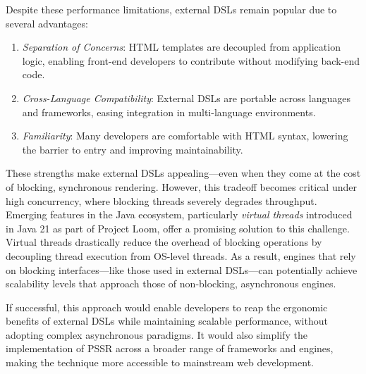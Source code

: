 Despite these performance limitations, external DSLs remain popular due to
several advantages:

\begin{enumerate}
    \item \emph{Separation of Concerns}: HTML templates are decoupled from application logic, enabling front-end developers to contribute without modifying back-end code.
    \item \emph{Cross-Language Compatibility}: External DSLs are portable across languages and frameworks, easing integration in multi-language environments.
    \item \emph{Familiarity}: Many developers are comfortable with HTML syntax, lowering the barrier to entry and improving maintainability.
\end{enumerate}

These strengths make external DSLs appealing—even when they come at the cost of
blocking, synchronous rendering. However, this tradeoff becomes critical under
high concurrency, where blocking threads severely degrades throughput. Emerging
features in the Java ecosystem, particularly \textit{virtual threads}
introduced in Java 21 as part of Project Loom, offer a promising solution to
this challenge. Virtual threads drastically reduce the overhead of blocking
operations by decoupling thread execution from OS-level threads. As a result,
engines that rely on blocking interfaces—like those used in
external DSLs—can potentially achieve scalability levels that approach those of
non-blocking, asynchronous engines.


If successful, this approach would enable developers to reap the ergonomic
benefits of external DSLs while maintaining scalable performance, without
adopting complex asynchronous paradigms. It would also simplify the
implementation of PSSR across a broader range of frameworks and engines, making
the technique more accessible to mainstream web development.